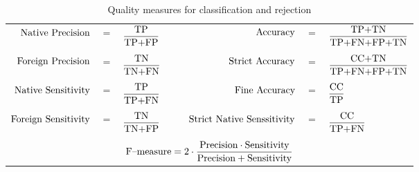 \documentclass{llncs}
\begin{document}
\begin{table}[!htbp]
\centering
\caption{Quality measures for classification and rejection}
{\footnotesize
\begin{tabular}{rclrcl}
  $\textnormal{Native Precision}$ &$=$& $\displaystyle\frac{\textnormal{TP}}{\textnormal{TP+FP}}$ & 
  $\textnormal{Accuracy}$ &$=$& $\displaystyle\frac{\textnormal{TP+TN}}{\textnormal{TP+FN+FP+TN}}$ \\
  &&&&&\vspace{-3pt}\\
  $\textnormal{Foreign Precision}$ &$=$& $\displaystyle\frac{\textnormal{TN}}{\textnormal{TN+FN}}$ &
  $\textnormal{Strict Accuracy}$ &$=$& $\displaystyle\frac{\textnormal{CC+TN}}{\textnormal{TP+FN+FP+TN}}$ \\
  &&&&&\vspace{-3pt}\\
  $\textnormal{Native Sensitivity}$ &$=$& $\displaystyle\frac{\textnormal{TP}}{\textnormal{TP+FN}}$ &
  $\textnormal{Fine Accuracy}$ &$=$& $\displaystyle\frac{\textnormal{CC}}{\textnormal{TP}}$ \\
  &&&&&\vspace{-3pt}\\
  $\textnormal{Foreign Sensitivity}$ &$=$& $\displaystyle\frac{\textnormal{TN}}{\textnormal{TN+FP}}$ &
  $\hspace{18pt}\textnormal{Strict Native Senssitivity}$ &$=$& $\displaystyle\frac{\textnormal{CC}}{\textnormal{TP+FN}}$\\
  &&&&&\vspace{-3pt}\\
  \multicolumn{6}{c}{$\textnormal{F--measure}=2\cdot\displaystyle\frac{\textnormal{Precision}\cdot\textnormal{Sensitivity}}{\textnormal{Precision}+\textnormal{Sensitivity}}$}\\
\end{tabular}
}
\label{tab:measures}
\vspace{-6pt}
\end{table}
\end{document}
